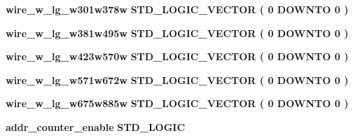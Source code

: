 \begin{DoxyCompactItemize}
\item 
{\bf wire\+\_\+w\+\_\+lg\+\_\+w301w378w} {\bfseries \textcolor{comment}{S\+T\+D\+\_\+\+L\+O\+G\+I\+C\+\_\+\+V\+E\+C\+T\+OR}\textcolor{vhdlchar}{ }\textcolor{vhdlchar}{(}\textcolor{vhdlchar}{ }\textcolor{vhdlchar}{ } \textcolor{vhdldigit}{0} \textcolor{vhdlchar}{ }\textcolor{keywordflow}{D\+O\+W\+N\+TO}\textcolor{vhdlchar}{ }\textcolor{vhdlchar}{ } \textcolor{vhdldigit}{0} \textcolor{vhdlchar}{ }\textcolor{vhdlchar}{)}\textcolor{vhdlchar}{ }} 
\item 
{\bf wire\+\_\+w\+\_\+lg\+\_\+w381w495w} {\bfseries \textcolor{comment}{S\+T\+D\+\_\+\+L\+O\+G\+I\+C\+\_\+\+V\+E\+C\+T\+OR}\textcolor{vhdlchar}{ }\textcolor{vhdlchar}{(}\textcolor{vhdlchar}{ }\textcolor{vhdlchar}{ } \textcolor{vhdldigit}{0} \textcolor{vhdlchar}{ }\textcolor{keywordflow}{D\+O\+W\+N\+TO}\textcolor{vhdlchar}{ }\textcolor{vhdlchar}{ } \textcolor{vhdldigit}{0} \textcolor{vhdlchar}{ }\textcolor{vhdlchar}{)}\textcolor{vhdlchar}{ }} 
\item 
{\bf wire\+\_\+w\+\_\+lg\+\_\+w423w570w} {\bfseries \textcolor{comment}{S\+T\+D\+\_\+\+L\+O\+G\+I\+C\+\_\+\+V\+E\+C\+T\+OR}\textcolor{vhdlchar}{ }\textcolor{vhdlchar}{(}\textcolor{vhdlchar}{ }\textcolor{vhdlchar}{ } \textcolor{vhdldigit}{0} \textcolor{vhdlchar}{ }\textcolor{keywordflow}{D\+O\+W\+N\+TO}\textcolor{vhdlchar}{ }\textcolor{vhdlchar}{ } \textcolor{vhdldigit}{0} \textcolor{vhdlchar}{ }\textcolor{vhdlchar}{)}\textcolor{vhdlchar}{ }} 
\item 
{\bf wire\+\_\+w\+\_\+lg\+\_\+w571w672w} {\bfseries \textcolor{comment}{S\+T\+D\+\_\+\+L\+O\+G\+I\+C\+\_\+\+V\+E\+C\+T\+OR}\textcolor{vhdlchar}{ }\textcolor{vhdlchar}{(}\textcolor{vhdlchar}{ }\textcolor{vhdlchar}{ } \textcolor{vhdldigit}{0} \textcolor{vhdlchar}{ }\textcolor{keywordflow}{D\+O\+W\+N\+TO}\textcolor{vhdlchar}{ }\textcolor{vhdlchar}{ } \textcolor{vhdldigit}{0} \textcolor{vhdlchar}{ }\textcolor{vhdlchar}{)}\textcolor{vhdlchar}{ }} 
\item 
{\bf wire\+\_\+w\+\_\+lg\+\_\+w675w885w} {\bfseries \textcolor{comment}{S\+T\+D\+\_\+\+L\+O\+G\+I\+C\+\_\+\+V\+E\+C\+T\+OR}\textcolor{vhdlchar}{ }\textcolor{vhdlchar}{(}\textcolor{vhdlchar}{ }\textcolor{vhdlchar}{ } \textcolor{vhdldigit}{0} \textcolor{vhdlchar}{ }\textcolor{keywordflow}{D\+O\+W\+N\+TO}\textcolor{vhdlchar}{ }\textcolor{vhdlchar}{ } \textcolor{vhdldigit}{0} \textcolor{vhdlchar}{ }\textcolor{vhdlchar}{)}\textcolor{vhdlchar}{ }} 
\item 
{\bf addr\+\_\+counter\+\_\+enable} {\bfseries \textcolor{comment}{S\+T\+D\+\_\+\+L\+O\+G\+IC}\textcolor{vhdlchar}{ }} 

\end{DoxyCompactItemize}
